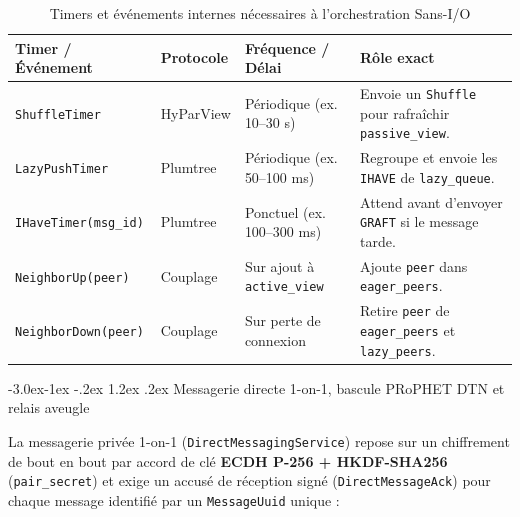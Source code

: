 \documentclass[11pt,a4paper]{article}
\makeatletter
\renewcommand\subsection{\@startsection{subsection}{2}{\z@}%
                                     {-3.0ex\@plus -1ex \@minus -.2ex}%
                                     {1.2ex \@plus .2ex}%
                                     {\normalfont\large\bfseries\color{PrimaryBlue}}}
\makeatother
\begin{document}
\begin{table}[h!]
\centering
\small
\begin{tabular}{@{}lllp{5.8cm}@{}}
\toprule
\textbf{Timer / Événement} & \textbf{Protocole} & \textbf{Fréquence / Délai} & \textbf{Rôle exact} \\
\midrule
\texttt{ShuffleTimer} & HyParView & Périodique (ex. 10--30 s) & Envoie un \texttt{Shuffle} pour rafraîchir \texttt{passive\_view}. \\
\texttt{LazyPushTimer} & Plumtree & Périodique (ex. 50--100 ms) & Regroupe et envoie les \texttt{IHAVE} de \texttt{lazy\_queue}. \\
\texttt{IHaveTimer(msg\_id)} & Plumtree & Ponctuel (ex. 100--300 ms) & Attend avant d'envoyer \texttt{GRAFT} si le message tarde. \\
\texttt{NeighborUp(peer)} & Couplage & Sur ajout à \texttt{active\_view} & Ajoute \texttt{peer} dans \texttt{eager\_peers}. \\
\texttt{NeighborDown(peer)} & Couplage & Sur perte de connexion & Retire \texttt{peer} de \texttt{eager\_peers} et \texttt{lazy\_peers}. \\
\bottomrule
\end{tabular}
\caption{Timers et événements internes nécessaires à l'orchestration Sans-I/O}
\end{table}

\subsection{Messagerie directe 1-on-1, bascule PRoPHET DTN et relais aveugle}

La messagerie privée 1-on-1 (\texttt{DirectMessagingService}) repose sur un chiffrement de bout en bout par accord de clé \textbf{ECDH P-256 + HKDF-SHA256} (\texttt{pair\_secret}) et exige un accusé de réception signé (\texttt{DirectMessageAck}) pour chaque message identifié par un \texttt{MessageUuid} unique :
\end{document}
